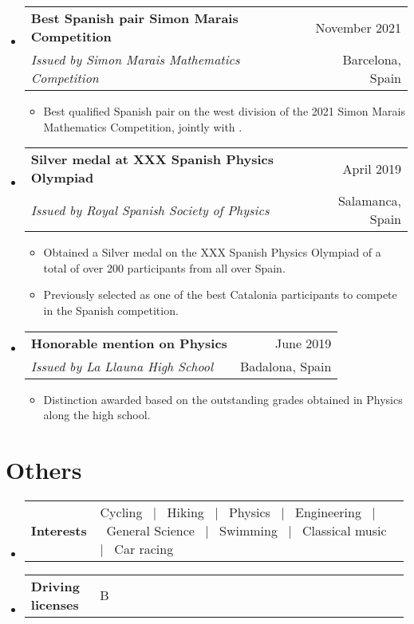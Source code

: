 \documentclass[a4paper,11pt]{article}
\makeatletter
\newcommand{\resumeSectionTypeOne}[2]{
  \item\begin{tabular*}{0.99\textwidth}[t]{
    p{0.18\linewidth}p{0.81\linewidth}
  }
  \textbf{#1} & #2
  \end{tabular*}\vspace{-2pt}
}
\newcommand{\resumeQuadHeading}[4]{
  \item
  \begin{tabular*}{0.96\textwidth}[t]{l@{\extracolsep{\fill}}r}
    \textbf{#1} & \small #2 \\
    \small#3 & \small #4 \\
  \end{tabular*}
}
\newcommand{\resumeHeadingListStart}{
  \begin{itemize}[leftmargin=0.15in, label={}]
}
\newcommand{\resumeHeadingListEnd}{\end{itemize}}
\makeatother
\begin{document}
\resumeHeadingListStart{}
\resumeQuadHeading{Best Spanish pair Simon Marais Competition}{November 2021}{\textit{Issued by Simon Marais Mathematics Competition}}{Barcelona, Spain}
\begin{itemize}[leftmargin=3em, itemsep=0.1em, topsep=2pt]
  \item \small Best qualified Spanish pair on the west division of the 2021 Simon Marais Mathematics Competition, jointly with \href{https://github.com/misaelmalqui}{}.
\end{itemize}
\resumeHeadingListEnd{}

\resumeHeadingListStart{}
\resumeQuadHeading{Silver medal at XXX Spanish Physics Olympiad}{April 2019}{\textit{Issued by Royal Spanish Society of Physics}}{Salamanca, Spain}
\begin{itemize}[leftmargin=3em, itemsep=0.1em, topsep=2pt]
  \item \small Obtained a Silver medal on the XXX Spanish Physics Olympiad of a total of over 200 participants from all over Spain.
  \item \small Previously selected as one of the best Catalonia participants to compete in the Spanish competition.
\end{itemize}
\resumeHeadingListEnd{}

\resumeHeadingListStart{}
\resumeQuadHeading{Honorable mention on Physics}{June 2019}{\textit{Issued by La Llauna High School}}{Badalona, Spain}
\begin{itemize}[leftmargin=3em, itemsep=0.1em, topsep=2pt]
  \item \small Distinction awarded based on the outstanding grades obtained in Physics along the high school.
\end{itemize}
\resumeHeadingListEnd{}

\section{Others}
\resumeHeadingListStart{}
\resumeSectionTypeOne{Interests}{Cycling \ $|$ \ Hiking  \ $|$ \ Physics  \ $|$ \ Engineering \ $|$ \ General Science \ $|$ \ Swimming \ $|$ \ Classical music \ $|$ \ Car racing}
\resumeHeadingListEnd{}

\resumeHeadingListStart{}
\resumeSectionTypeOne{Driving licenses}{B}
\resumeHeadingListEnd{}
\end{document}
